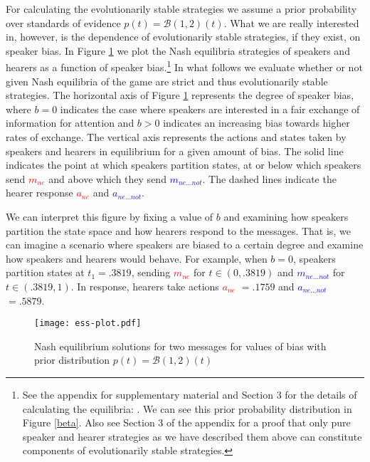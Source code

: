 \documentclass[linguex]{sp}
\theoremstyle{definition} \newtheorem{definition}{Definition}
\begin{document}
For calculating the evolutionarily stable strategies we assume a prior probability over standards of evidence $p(t) = \mathcal{B}(1,2)(t)$.  What we are really interested in, however, is the dependence of evolutionarily stable strategies, if they exist, on speaker bias. In Figure \ref{ess-plot} we plot the Nash equilibria strategies of speakers and hearers as a function of speaker bias.\footnote{See the appendix for supplementary material and Section 3 for the details of calculating the equilibria: . We can see this prior probability distribution in Figure \ref{beta}. Also see Section 3 of the appendix for a proof that only pure speaker and hearer strategies as we have described them above can constitute components of evolutionarily stable strategies.}  In what follows we evaluate whether or not given Nash equilibria of the game are strict and thus evolutionarily stable strategies. The horizontal axis of Figure \ref{ess-plot} represents the degree of speaker bias, where $b=0$ indicates the case where speakers are interested in a fair exchange of information for attention and $b > 0$ indicates an increasing bias towards higher rates of exchange. The vertical axis represents the actions and states taken by speakers and hearers in equilibrium for a given amount of bias. The solid line indicates the point at which speakers partition states, at or below which speakers send \emph{\textcolor{red}{$m_{ne}$}} and above which they send \emph{\textcolor{blue}{$m_{ne...not}$}}. The dashed lines indicate the hearer response \emph{\textcolor{red}{$a_{ne}$}} and \emph{\textcolor{blue}{$a_{ne...not}$}}.  

We can interpret this figure by fixing a value of $b$ and examining how speakers partition the state space and how hearers respond to the messages.  That is, we can imagine a scenario where speakers are biased to a certain degree and examine how speakers and hearers would behave. For example, when $b=0$, speakers partition states at $t_1 = .3819$, sending \emph{\textcolor{red}{$m_{ne}$}} for $t \in (0, .3819)$ and \emph{\textcolor{blue}{$m_{ne...not}$}} for $t \in (.3819, 1)$. In response, hearers take actions \emph{\textcolor{red}{$a_{ne}$}} $=.1759$ and \emph{\textcolor{blue}{$a_{ne...not}$}} $ =.5879$. 

\begin{figure}
\begin{center}
	\texttt{[image: ess-plot.pdf]}
	\caption{Nash equilibrium solutions for two messages for values of bias with prior distribution $p(t) = \mathcal{B}(1,2)(t)$}
	\label{ess-plot}
\end{center}
\end{figure}
\end{document}

